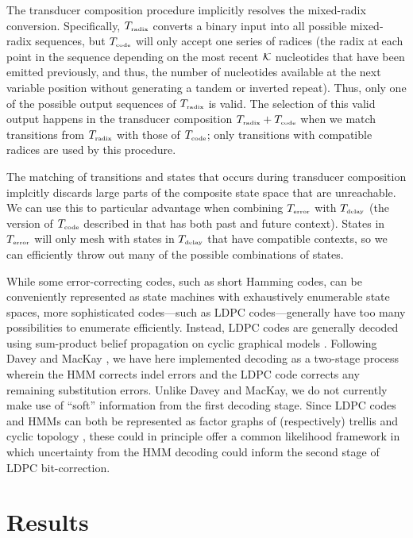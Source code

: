 \documentclass[english]{article}
\begin{document}
The transducer composition procedure implicitly resolves the mixed-radix conversion.
Specifically, $T_{\mbox{\tiny radix}}$ converts a binary input into all possible mixed-radix sequences,
but $T_{\mbox{\tiny code}}$ will only accept one series of radices (the radix at each point in the sequence depending
on the most recent ${\cal K}$ nucleotides that have been emitted previously, and thus, the number of nucleotides available
at the next variable position without generating a tandem or inverted repeat).
Thus, only one of the possible output sequences of $T_{\mbox{\tiny radix}}$ is valid.
The selection of this valid output happens in the transducer composition $T_{\mbox{\tiny radix}} + T_{\mbox{\tiny code}}$
when we match transitions from $T_{\mbox{\tiny radix}}$ with those of $T_{\mbox{\tiny code}}$;
only transitions with compatible radices are used by this procedure.

The matching of transitions and states that occurs during transducer composition
implcitly discards large parts of the composite state space that are unreachable.
We can use this to particular advantage when combining $T_{\mbox{\tiny error}}$ with $T_{\mbox{\tiny delay}}$
(the version of $T_{\mbox{\tiny code}}$ described in  that has both past and future context).
States in $T_{\mbox{\tiny error}}$ will only mesh with states in $T_{\mbox{\tiny delay}}$ that have compatible contexts,
so we can efficiently throw out many of the possible combinations of states.

While some error-correcting codes, such as short Hamming codes, can be conveniently represented
as state machines with exhaustively enumerable state spaces,
more sophisticated codes---such as LDPC codes---generally have too many possibilities to enumerate efficiently.
Instead, LDPC codes are generally decoded using sum-product belief propagation on cyclic graphical models \cite{Mackay1997,FreyMackay98}.
Following Davey and MacKay \cite{DaveyMackay2000},
we have here implemented decoding as a two-stage process wherein the HMM corrects indel errors
and the LDPC code corrects any remaining substitution errors.
Unlike Davey and MacKay, we do not currently make use of ``soft'' information from the
first decoding stage.
Since LDPC codes and HMMs can both be represented as factor graphs
of (respectively) trellis and cyclic topology \cite{Kschischang2006},
these could in principle offer a common likelihood framework in which uncertainty from the HMM decoding
could inform the second stage of LDPC bit-correction.


\section{Results}
\end{document}
